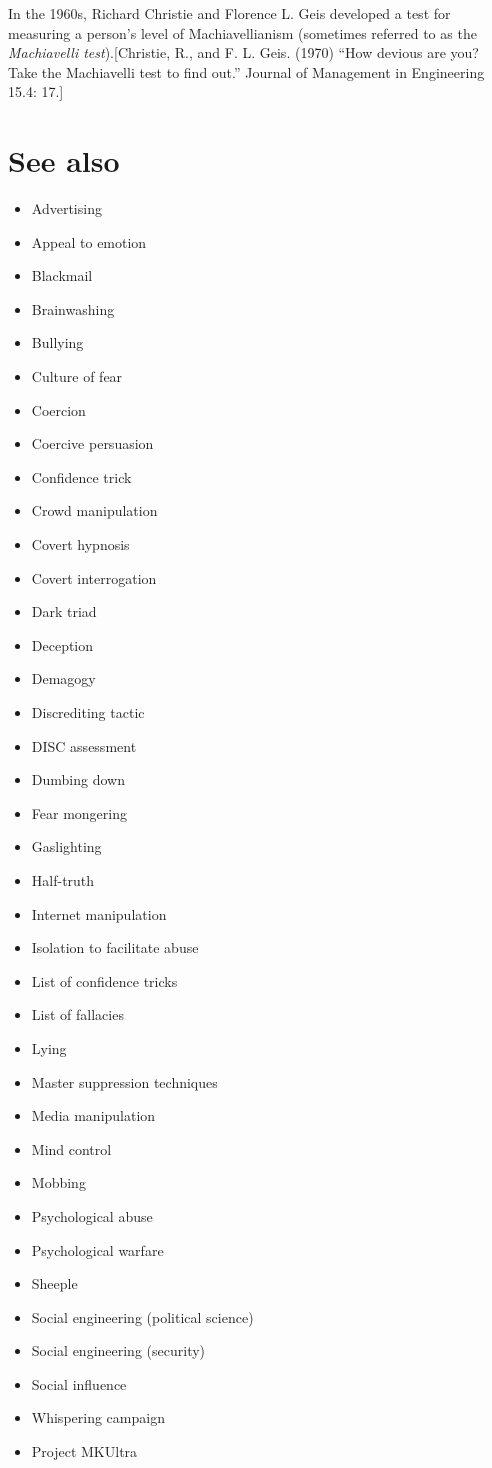 \documentclass{book}
\numberwithin{equation}{section}
\begin{document}
In the 1960s, Richard Christie and Florence L. Geis developed a test for measuring a person's level of Machiavellianism (sometimes referred to as the \textit{Machiavelli test}).[Christie, R., and F. L. Geis. (1970) ``How devious are you? Take the Machiavelli test to find out.'' Journal of Management in Engineering 15.4: 17.] 

\section{See also}
\begin{itemize}
    \item Advertising
    \item Appeal to emotion
    \item Blackmail
    \item Brainwashing
    \item Bullying
    \item Culture of fear
    \item Coercion
    \item Coercive persuasion
    \item Confidence trick
    \item Crowd manipulation
    \item Covert hypnosis
    \item Covert interrogation
    \item Dark triad
    \item Deception
    \item Demagogy
    \item Discrediting tactic
    \item DISC assessment
    \item Dumbing down
    \item Fear mongering
    \item Gaslighting
    \item Half-truth
    \item Internet manipulation
    \item Isolation to facilitate abuse
    \item List of confidence tricks
    \item List of fallacies
    \item Lying
    \item Master suppression techniques
    \item Media manipulation
    \item Mind control
    \item Mobbing
    \item Psychological abuse
    \item Psychological warfare
    \item Sheeple
    \item Social engineering (political science)
    \item Social engineering (security)
    \item Social influence
    \item Whispering campaign
    \item Project MKUltra
\end{itemize}
\end{document}
